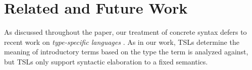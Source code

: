 \documentclass[10pt,preprint]{sigplanconf}
\begin{document}

\section{Related and Future Work}\label{prior-work}
As discussed throughout the paper, our treatment of concrete syntax defers to recent work on \emph{type-specific languages} \cite{TSLs}. As in our work, TSLs determine the meaning of introductory terms based on the type the term is analyzed against, but TSLs only support syntactic elaboration to a fixed semantics. 
\end{document}
